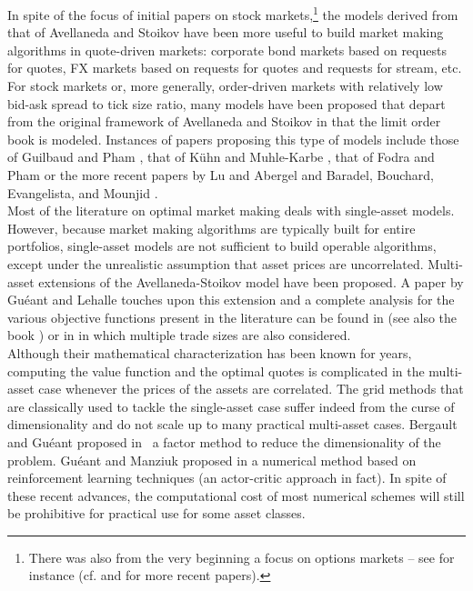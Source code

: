 \documentclass[preprint, 3p]{elsarticle}
\newcommand{\1}{{\chi}}
\begin{document}
In spite of the focus of initial papers on stock markets,\footnote{There was also from the very beginning a focus on options markets -- see for instance \cite{stoikov2009option} (cf. \cite{baldacci2019algorithmic} and \cite{el2015stochastic} for more recent papers).} the models derived from that of Avellaneda and Stoikov have been more useful to build market making algorithms in quote-driven markets: corporate bond markets based on requests for quotes, FX markets based on requests for quotes and requests for stream, etc. For stock markets or, more generally, order-driven markets with relatively low bid-ask spread to tick size ratio, many models have been proposed that depart from the original framework of Avellaneda and Stoikov in that the limit order book is modeled. Instances of papers proposing this type of models include those of Guilbaud and Pham \cite{guilbaud2013optimal, guilbaud2015optimal}, that of K\"uhn and Muhle-Karbe \cite{kuhn2013optimal}, that of Fodra and Pham \cite{fodra2015high} or the more recent papers by Lu and Abergel \cite{lu2018order} and Baradel, Bouchard, Evangelista, and Mounjid \cite{baradel2018optimal}.\\

Most of the literature on optimal market making deals with single-asset models. However, because market making algorithms are typically built for entire portfolios, single-asset models are not sufficient to build operable algorithms, except under the unrealistic assumption that asset prices are uncorrelated. Multi-asset extensions of the Avellaneda-Stoikov model have been proposed. A paper by Gu\'eant and Lehalle \cite{gueant2015general} touches upon this extension and a complete analysis for the various objective functions present in the literature can be found in \cite{gueant2017optimal} (see also the book \cite{gueant2016financial}) or in \cite{bergault2019size} in which multiple trade sizes are also considered.\\

Although their mathematical characterization has been known for years, computing the value function and the optimal quotes is complicated in the multi-asset case whenever the prices of the assets are correlated. The grid methods that are classically used to tackle the single-asset case suffer indeed from the curse of dimensionality and do not scale up to many practical multi-asset cases. Bergault and Guéant proposed in~\cite{bergault2019size} a factor method to reduce the dimensionality of the problem. Guéant and Manziuk proposed in \cite{gueant2019deep} a numerical method based on reinforcement learning techniques (an actor-critic approach in fact). In spite of these recent advances, the computational cost of most numerical schemes will still be prohibitive for practical use for some asset classes.\\
\end{document}
